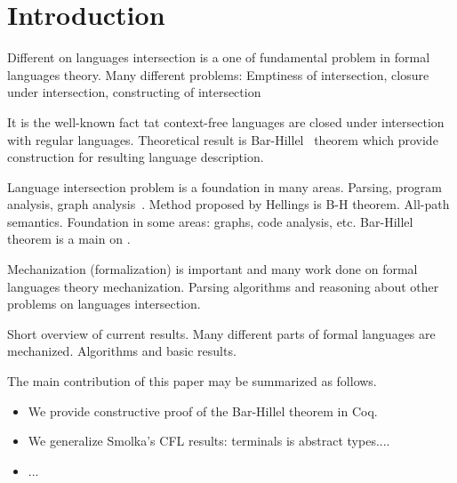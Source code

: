\section{Introduction}

Different on languages intersection is a one of fundamental problem in formal languages theory.
Many different problems: Emptiness of intersection, closure under intersection, constructing of intersection 

It is the well-known fact tat context-free languages are closed under intersection with regular languages. 
Theoretical result is Bar-Hillel~\cite{bar1961formal} theorem which provide construction for resulting language description.

Language intersection problem is a foundation in many areas.
Parsing, program analysis, graph analysis~\cite{hellingsRelational, hellingsPathQuerying}.
Method proposed by Hellings is B-H theorem. 
All-path semantics.
Foundation in some areas: graphs, code analysis, etc.
Bar-Hillel theorem is a main on .

Mechanization (formalization) is important and many work done on formal languages theory mechanization. 
Parsing algorithms and reasoning about other problems on languages intersection.

Short overview of current results.
Many different parts of formal languages are mechanized. 
Algorithms and basic results.

The main contribution of this paper may be summarized as follows.
\begin{itemize}
\item We provide constructive proof of the Bar-Hillel theorem in Coq.
\item We generalize Smolka's CFL results: terminals is abstract types....
\item ...
\end{itemize}
